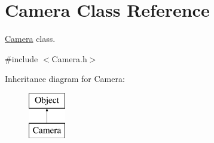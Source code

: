 \hypertarget{class_camera}{}\section{Camera Class Reference}
\label{class_camera}


\hyperlink{class_camera}{Camera} class.  




{\ttfamily \#include $<$Camera.\+h$>$}

Inheritance diagram for Camera\+:\begin{figure}[H]
\begin{center}
\leavevmode
\includegraphics[height=2.000000cm]{class_camera}
\end{center}
\end{figure}
